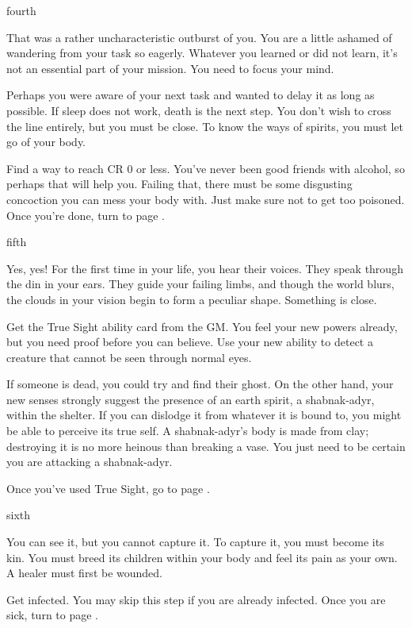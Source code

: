 \documentclass[greennotebook]{Pestilence} %
\begin{document}
\begin{page}{fourth}

That was a rather uncharacteristic outburst of you. You are a little ashamed of wandering from your task so eagerly. Whatever you learned or did not learn, it's not an essential part of your mission. You need to focus your mind. 

Perhaps you were aware of your next task and wanted to delay it as long as possible. If sleep does not work, death is the next step. You don't wish to cross the line entirely, but you must be close. To know the ways of spirits, you must let go of your body.

Find a way to reach CR 0 or less. You've never been good friends with alcohol, so perhaps that will help you. Failing that, there must be some disgusting concoction you can mess your body with. Just make sure not to get too poisoned. Once you're done, turn to page .

\end{page}

\begin{page}{fifth}

Yes, yes! For the first time in your life, you hear their voices. They speak through the din in your ears. They guide your failing limbs, and though the world blurs, the clouds in your vision begin to form a peculiar shape. Something is close.

Get the True Sight ability card from the GM. You feel your new powers already, but you need proof before you can believe. Use your new ability to detect a creature that cannot be seen through normal eyes. 

If someone is dead, you could try and find their ghost. On the other hand, your new senses strongly suggest the presence of an earth spirit, a shabnak-adyr, within the shelter. If you can dislodge it from whatever it is bound to, you might be able to perceive its true self. A shabnak-adyr's body is made from clay; destroying it is no more heinous than breaking a vase. You just need to be certain you are attacking a shabnak-adyr.

Once you've used True Sight, go to page .

\end{page}

\begin{page}{sixth}

You can see it, but you cannot capture it. To capture it, you must become its kin. You must breed its children within your body and feel its pain as your own. A healer must first be wounded.

Get infected. You may skip this step if you are already infected. Once you are sick, turn to page .

\end{page}
\end{document}
